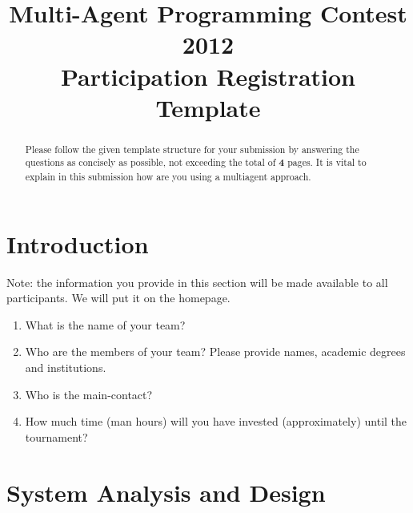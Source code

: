 \documentclass{llncs}
\begin{document}
\title{Multi-Agent Programming Contest 2012\\Participation Registration Template}
\author{}
\institute{}
\maketitle

\begin{abstract}
  Please follow the given template structure for your submission by
  answering the questions as concisely as possible, not exceeding the
  total of \textbf{4} pages. It is vital to explain in this submission
  how are you using a multiagent approach.


\end{abstract}


\section*{Introduction}

Note: the information you provide in this section will be made available
to all participants. We will put it on the homepage.

\begin{enumerate}
\item What is the name of your team?
\item Who are the members of your team? Please provide names, academic
  degrees and institutions.
\item Who is the main-contact?
\item How much time (man hours) will you have invested (approximately)
  until the tournament?
\end{enumerate}

\section*{System Analysis and Design}
\end{document}
